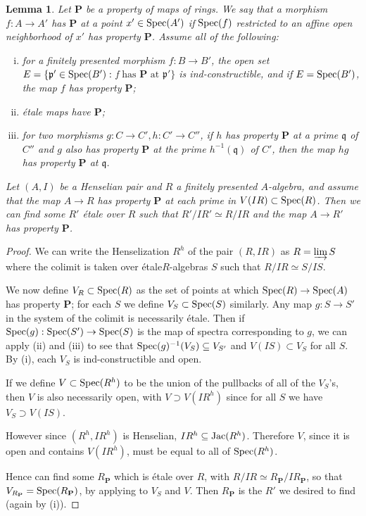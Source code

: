 \documentclass[12pt]{article}
\newcommand{\spec}{{\rm Spec}}
\newcommand{\Jac}{{\rm Jac}}
\newcommand{\colim}{\varinjlim}
\newcommand{\mf}[1]{\mathfrak{#1}}
\newcommand{\Et}{\'etale\xspace}
\newtheorem{lemma}[theorem]{Lemma}
\theoremstyle{definition}
\numberwithin{equation}{subsection}
\begin{document}
\begin{lemma}\label{lem:getbiggeret} Let $\mathbf{P}$ be a property of maps of rings. We say that a morphism $f: A \to A'$ has $\mathbf{P}$ at a point $x' \in \spec(A')$ if $\spec(f)$ restricted to an affine open neighborhood of $x'$ has property $\mathbf{P}$. Assume all of the following:
\begin{enumerate}[(i)]
\item for a finitely presented morphism $f: B \to B'$, the open set $E=\{\mf{p}' \in \spec(B'): \;$f$ \text{ has } \mathbf{P} \text{ at } \mf{p}'\}$ is ind-constructible, and if $E=\spec(B')$, the map $f$ has property $\mathbf{P}$;
\item \Et maps have $\mathbf{P}$;
\item for two morphisms $g: C \to C', h: C' \to C''$, if $h$ has property $\mathbf{P}$ at a prime $\mf{q}$ of $C''$ and $g$ also has property $\mathbf{P}$ at the prime $h^{-1}(\mf{q})$ of $C'$, then the map $hg$ has property $\mathbf{P}$ at $\mf{q}$. 
\end{enumerate}

Let $(A,I)$ be a Henselian pair and $R$ a finitely presented $A$-algebra, and assume that the map $A \to R$ has property $\mathbf{P}$ at each prime in $V(IR) \subset \spec(R)$. Then we can find some $R'$ \Et over $R$ such that $R'/IR' \simeq R/IR$ and the map $A \to R'$ has property $\mathbf{P}$. 
\end{lemma}
\begin{proof} 

We can write the Henselization $R^h$ of the pair $(R,IR)$ as $R = \colim S$ where the colimit is taken over \Et $R$-algebras $S$ such that $R/IR \simeq S/IS$. 

We now define $V_R \subset \spec(R)$ as the set of points at which $\spec(R) \to \spec(A)$ has property $\mathbf{P}$; for each $S$ we define $V_S \subset \spec(S)$ similarly. Any map $g: S \to S'$ in the system of the colimit is necessarily \Et. Then if $\spec(g): \spec(S') \to \spec(S)$ is the map of spectra corresponding to $g$, we can apply (ii) and (iii) to see that $\spec(g)^{-1}(V_S) \subseteq V_{S'}$ and $V(IS) \subset V_S$ for all $S$. By (i), each $V_S$ is ind-constructible and open.

If we define $V \subset \spec(R^h)$ to be the union of the pullbacks of all of the $V_S$'s, then $V$ is also necessarily open, with $V \supset V(IR^h)$ since for all $S$ we have $V_S \supset V(IS)$. 

However since $(R^h,IR^h)$ is Henselian, $IR^h\subseteq \Jac(R^h)$. Therefore $V$, since it is open and contains $V(IR^h)$, must  be equal to all of $\spec(R^h)$.

Hence can find some $R_{\mathbf{P}}$ which is \Et over $R$, with $R/IR \simeq R_{\mathbf{P}}/IR_{\mathbf{P}}$, so that $V_{R_{\mathbf{P}}}=\spec(R_{\mathbf{P}})$, by applying \cite[Corollary 8.3.4]{ega43} to $V_S$ and $V$. Then $R_{\mathbf{P}}$ is the $R'$ we desired to find (again by (i)).\end{proof}
\end{document}
